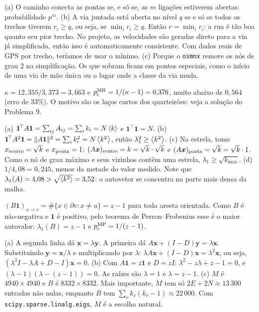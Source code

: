 \documentclass[11pt]{article}
\begin{document}
(a) O caminho conecta as pontas se, e só se, as $m$ ligações estiverem abertas: probabilidade $p^m$. (b) A via juntada está aberta no nível $q$ se e só se todos os trechos tiverem $r_i\ge q$, ou seja, se $\min_i r_i \ge q$. Então $r = \min_i r_i$: a rua é tão boa quanto seu pior trecho. No projeto, as velocidades são geradas direto para a via já simplificada, então isso é automaticamente consistente. Com dados reais de GPS por trecho, teríamos de usar o mínimo. (c) Porque o \texttt{osmnx} remove os nós de grau 2 na simplificação. Os que sobram ficam em pontos especiais, como o início de uma via de mão única ou o lugar onde a classe da via muda.

$\kappa = 12{,}355/3{,}373 = 3{,}663$ e $p_c^{\rm MR} = 1/(\kappa-1) = 0{,}376$, muito abaixo de $0{,}564$ (erro de 33\%). O motivo são os laços curtos dos quarteirões: veja a solução do Problema 9.

(a) $\bm1^{\!\top}A\bm1 = \sum_{ij}A_{ij} = \sum_i k_i = N\left\langle k \right\rangle$ e $\bm1^{\!\top}\bm1 = N$. (b) $\bm1^{\!\top}A^2\bm1 = \|A\bm1\|^2 = \sum_i k_i^2 = N\left\langle k^2 \right\rangle$, então $\lambda_1^2\ge\left\langle k^2 \right\rangle$. (c) Na estrela, tome $x_{\rm centro} = \sqrt k$ e $x_{\rm ponta} = 1$: $(A\bm x)_{\rm centro} = k = \sqrt k\cdot\sqrt k$ e $(A\bm x)_{\rm ponta} = \sqrt k = \sqrt k\cdot1$. Como o nó de grau máximo e seus vizinhos contêm uma estrela, $\lambda_1\ge\sqrt{k_{\max}}$. (d) $1/4{,}08 = 0{,}245$, menos da metade do valor medido. Note que $\lambda_1(A) = 4{,}08 > \sqrt{\left\langle k^2 \right\rangle} = 3{,}52$: o autovetor se concentra na parte mais densa da malha.

$(B\bm1)_{u\to v} = \#\{x\in\partial v: x\ne u\} = z-1$ para toda aresta orientada. Como $B$ é não-negativa e $\bm1$ é positivo, pelo teorema de Perron--Frobenius esse é o maior autovalor: $\lambda_1(B) = z-1$ e $p_c^{\rm MP}=1/(z-1)$.

(a) A segunda linha dá $\bm x = \lambda\bm y$. A primeira dá $A\bm x+(I-D)\bm y = \lambda\bm x$. Substituindo $\bm y = \bm x/\lambda$ e multiplicando por $\lambda$: $\lambda A\bm x + (I-D)\bm x = \lambda^2\bm x$, ou seja, $(\lambda^2I-\lambda A+D-I)\bm x = 0$. (b) Com $A\bm1 = z\bm1$ e $D=zI$: $\lambda^2-z\lambda+z-1 = 0$, e $(\lambda-1)(\lambda-(z-1))=0$. As raízes são $\lambda=1$ e $\lambda = z-1$. (c) $M$ é $4940\times4940$ e $B$ é $8332\times8332$. Mais importante, $M$ tem só $2E+2N\approx 13\,300$ entradas não nulas, enquanto $B$ tem $\sum_v k_v(k_v-1)\approx 22\,000$. Com \texttt{scipy.sparse.linalg.eigs}, $M$ é a escolha natural.
\end{document}
